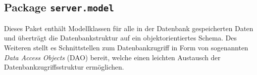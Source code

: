  \FloatBarrier
 \subsection[Package server.model]{Package \texttt{server.model}}
Dieses Paket enthält Modellklassen für alle in der Datenbank gespeicherten Daten und überträgt die Datenbankstruktur auf ein objektorientiertes Schema. Des Weiteren stellt es Schnittstellen zum Datenbankzugriff in Form von sogenannten \emph{Data Access Objects} (DAO) bereit, welche einen leichten Austausch der Datenbankzugriffsstruktur ermöglichen.


 
